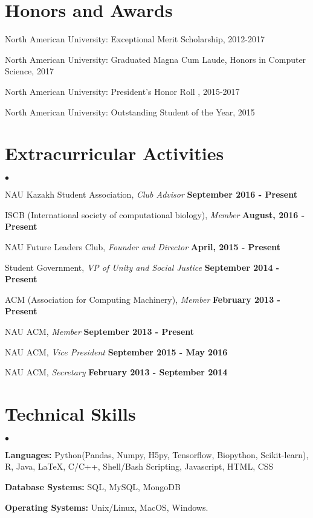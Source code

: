 \documentclass[margin,line]{res}
\newenvironment{list2}{
  \begin{list}{$\bullet$}{%
      \setlength{\itemsep}{0in}
      \setlength{\parsep}{0in} \setlength{\parskip}{0in}
      \setlength{\topsep}{0in} \setlength{\partopsep}{0in} 
      \setlength{\leftmargin}{0.2in}}}{\end{list}}
\begin{document}
\begin{resume}
\section{\sc Honors and Awards} 

North American University: Exceptional Merit Scholarship, 2012-2017

\vspace*{-2.5mm}
North American University: Graduated Magna Cum Laude, Honors in Computer Science, 2017

\vspace*{-2.5mm}
North American University: President's Honor Roll , 2015-2017

\vspace*{-2.5mm}
North American University: Outstanding Student of the Year, 2015


\section{\sc Extracurricular Activities}
\begin{list2}
\item NAU Kazakh Student Association, {\em Club Advisor} \hfill {\bf September 2016 - Present} 
\item ISCB (International society of computational biology), {\em Member} \hfill {\bf August, 2016 - Present}
\item NAU Future Leaders Club, {\em Founder and Director} \hfill {\bf April, 2015 - Present}
\item Student Government, {\em VP of Unity and Social Justice} \hfill  {\bf September 2014 - Present}
\item ACM (Association for Computing Machinery), {\em Member} \hfill  {\bf February 2013 - Present}
\item NAU ACM, {\em Member} \hfill {\bf September 2013 - Present}
\item NAU ACM, {\em Vice President} \hfill  {\bf September 2015 - May 2016}
\item NAU ACM, {\em Secretary} \hfill  {\bf February 2013 - September 2014}
\end{list2}

\section{\sc Technical Skills} 
\begin{list2}
\item {\bf Languages:}  Python(Pandas, Numpy, H5py, Tensorflow, Biopython, Scikit-learn), R, Java, \LaTeX, C/C++, Shell/Bash Scripting, Javascript, HTML, CSS
\item {\bf Database Systems:} SQL, MySQL, MongoDB
\item {\bf Operating Systems:}  Unix/Linux, MacOS, Windows.
\end{list2}


\end{resume}
\end{document}
